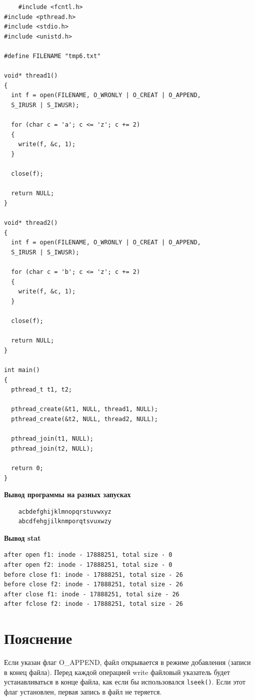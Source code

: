 \begin{lstlisting}
	#include <fcntl.h>
#include <pthread.h>
#include <stdio.h>
#include <unistd.h>

#define FILENAME "tmp6.txt"

void* thread1()
{
  int f = open(FILENAME, O_WRONLY | O_CREAT | O_APPEND,
  S_IRUSR | S_IWUSR);

  for (char c = 'a'; c <= 'z'; c += 2)
  {
    write(f, &c, 1);
  }

  close(f);

  return NULL;
}

void* thread2() 
{
  int f = open(FILENAME, O_WRONLY | O_CREAT | O_APPEND,
  S_IRUSR | S_IWUSR);

  for (char c = 'b'; c <= 'z'; c += 2)
  { 
    write(f, &c, 1);
  }

  close(f);

  return NULL;
}

int main()
{
  pthread_t t1, t2;

  pthread_create(&t1, NULL, thread1, NULL);
  pthread_create(&t2, NULL, thread2, NULL);

  pthread_join(t1, NULL);
  pthread_join(t2, NULL);

  return 0;
}
\end{lstlisting}

\textbf{Вывод программы на разных запусках}

\begin{lstlisting}
	acbdefghijklmnopqrstuvwxyz
	abcdfehgjilknmporqtsvuxwzy
\end{lstlisting}

\textbf{Вывод stat}

\begin{lstlisting}
after open f1: inode - 17888251, total size - 0
after open f2: inode - 17888251, total size - 0
before close f1: inode - 17888251, total size - 26
before close f2: inode - 17888251, total size - 26
after close f1: inode - 17888251, total size - 26
after fclose f2: inode - 17888251, total size - 26
\end{lstlisting}

\section{Пояснение}
Если указан флаг O\_APPEND, файл открывается в режиме добавления (записи в конец файла). Перед каждой операцией write файловый указатель будет устанавливаться в конце файла, как если бы использовался \texttt{lseek()}. Если этот флаг установлен, первая запись в файл не теряется.

